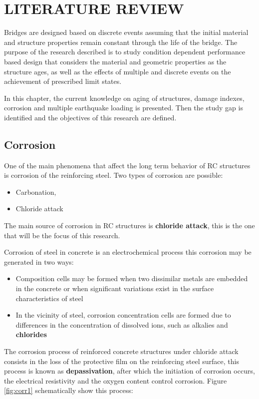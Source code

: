 \chapter{LITERATURE REVIEW}
\label{chap-two}
Bridges are designed based on discrete events assuming that the initial material and structure properties remain constant through the life of the bridge. The purpose of the research described is to study condition dependent performance based design that considers the material and geometric properties as the structure ages, as well as the effects of multiple and discrete events on the achievement of prescribed limit states.

In this chapter, the current knowledge on aging of structures, damage indexes, corrosion and multiple earthquake loading is presented. Then the study gap is identified and the objectives of this research are defined.

\section{Corrosion}

One of the main phenomena that affect the long term behavior of RC structures is corrosion of the reinforcing steel. Two types of corrosion are possible:
\begin{itemize}
		\item Carbonation, 
		\item Chloride attack
\end{itemize}

The main source of corrosion in RC structures is \textbf{chloride attack}, this is the one that will be the focus of this research.

Corrosion of steel in concrete is an electrochemical process \cite{Mehta2014} this corrosion may be generated in two ways:
\begin{itemize}
	\item Composition cells may be formed when two dissimilar metals are embedded in the concrete or when significant variations exist in the surface characteristics of steel
	\item In the vicinity of steel, corrosion concentration cells are formed due to differences in the concentration of dissolved ions, such as alkalies and \textbf{chlorides}
\end{itemize}

The corrosion process of reinforced concrete structures under chloride attack consists in the loss of the protective film on the reinforcing steel surface, this process is known as \textbf{depassivation}, after which the initiation of corrosion occurs, the electrical resistivity and the oxygen content control corrosion. Figure \ref{fig:corr1} schematically show this process:

